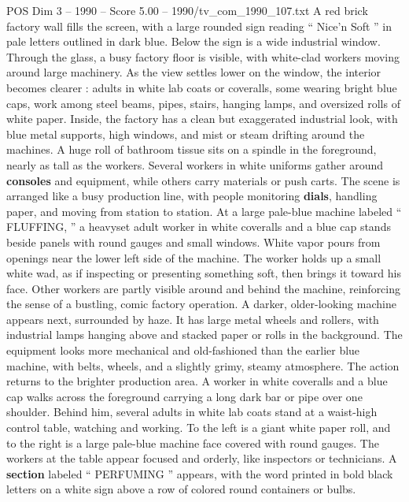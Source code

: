 \begin{textsample}{POS Dim 3 – 1990 – Score 5.00 – 1990/tv\_com\_1990\_107.txt}  \label{ex:f3_pos_058}
A red brick factory wall fills the screen, with a large rounded sign reading “ Nice’n Soft ” in pale letters outlined in dark blue.
Below the sign is a wide industrial window.
Through the glass, a busy factory floor is visible, with white-clad workers moving around large machinery.
As the view settles lower on the window, the interior becomes clearer : adults in white lab coats or coveralls, some wearing bright blue caps, work among steel beams, pipes, stairs, hanging lamps, and oversized rolls of white paper.
Inside, the factory has a clean but exaggerated industrial look, with blue metal supports, high windows, and mist or steam drifting around the machines.
A huge roll of bathroom tissue sits on a spindle in the foreground, nearly as tall as the workers.
Several workers in white uniforms gather around \textbf{consoles} and equipment, while others carry materials or push carts.
The scene is arranged like a busy production line, with people monitoring \textbf{dials}, handling paper, and moving from station to station.
At a large pale-blue machine labeled “ FLUFFING, ” a heavyset adult worker in white coveralls and a blue cap stands beside panels with round gauges and small windows.
White vapor pours from openings near the lower left side of the machine.
The worker holds up a small white wad, as if inspecting or presenting something soft, then brings it toward his face.
Other workers are partly visible around and behind the machine, reinforcing the sense of a bustling, comic factory operation.
A darker, older-looking machine appears next, surrounded by haze.
It has large metal wheels and rollers, with industrial lamps hanging above and stacked paper or rolls in the background.
The equipment looks more mechanical and old-fashioned than the earlier blue machine, with belts, wheels, and a slightly grimy, steamy atmosphere.
The action returns to the brighter production area.
A worker in white coveralls and a blue cap walks across the foreground carrying a long dark bar or pipe over one shoulder.
Behind him, several adults in white lab coats stand at a waist-high control table, watching and working.
To the left is a giant white paper roll, and to the right is a large pale-blue machine face covered with round gauges.
The workers at the table appear focused and orderly, like inspectors or technicians.
A \textbf{section} labeled “ PERFUMING ” appears, with the word printed in bold black letters on a white sign above a row of colored round containers or bulbs.

\end{textsample}
